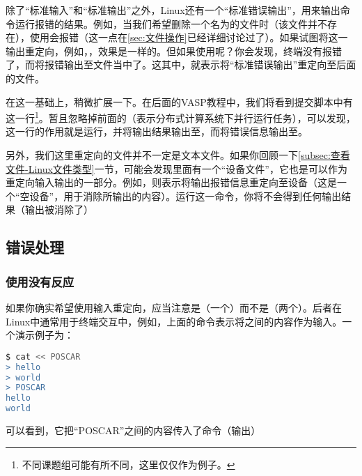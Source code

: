 \begin{extend}
    除了“标准输入”和“标准输出”之外，Linux还有一个“标准错误输出”，用来输出命令运行报错的结果。例如，当我们希望删除一个名为的文件时（该文件并不存在），使用会报错（这一点在\ref{sec:文件操作}已经详细讨论过了）。如果试图将这一输出重定向，例如，，效果是一样的。但如果使用呢？你会发现，终端没有报错了，而将报错输出至文件当中了。这其中，就表示将“标准错误输出”重定向至后面的文件。

    在这一基础上，稍微扩展一下。在后面的VASP教程中，我们将看到提交脚本中有这一行\footnote{不同课题组可能有所不同，这里仅仅作为例子。}。暂且忽略掉前面的（表示分布式计算系统下并行运行任务），可以发现，这一行的作用就是运行，并将输出结果输出至，而将错误信息输出至。

    另外，我们这里重定向的文件并不一定是文本文件。如果你回顾一下\ref{subsec:查看文件-Linux文件类型}一节，可能会发现里面有一个“设备文件”，它也是可以作为重定向输入输出的一部分。例如，则表示将输出报错信息重定向至设备（这是一个“空设备”，用于消除所输出的内容）。运行这一命令，你将不会得到任何输出结果（输出被消除了）
\end{extend}


\subsection{错误处理}\label{subsec:管道与重定向-错误处理}

\subsubsection{使用没有反应}

如果你确实希望使用输入重定向，应当注意是\code{<}（一个）而不是\code{<<}（两个）。后者在Linux中通常用于终端交互中，例如，上面的命令表示将之间的内容作为输入。一个演示例子为：

\begin{lstlisting}[language=bash]
$ cat << POSCAR
> hello
> world
> POSCAR
hello
world
\end{lstlisting}

可以看到，它把“POSCAR”之间的内容传入了命令（输出）


